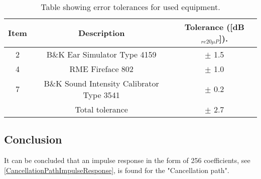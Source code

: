 \begin{table}[h]
	\centering
	\begin{tabular}{ c c c } \toprule
		{Item}	& 		{Description} 	& {Tolerance ([dB$_{re20\mu P}$])}.	 \\ \bottomrule 
		2	&	B\&K Ear Simulator Type 4159				& $\pm$ 1.5 	\\
		4	&	RME Fireface 802			& $\pm$ 1.0	\\
		7	&	B\&K Sound Intensity Calibrator Type 3541	& $\pm$ 0.2	\\ \bottomrule
			&	Total tolerance								& $\pm$ 2.7	\\ \bottomrule	
	\end{tabular}
	\caption{Table showing error tolerances for used equipment.}
	\label{TolerancesCP}
\end{table}

\subsection{Conclusion}
It can be concluded that an impulse response in the form of 256 coefficients, see \autoref{CancellationPathImpulseResponse}, is found for the "Cancellation path".
